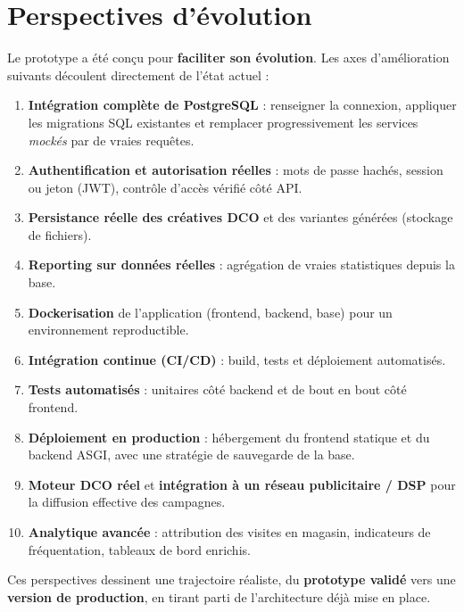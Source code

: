 \section{Perspectives d'évolution}

Le prototype a été conçu pour \textbf{faciliter son évolution}. Les axes
d'amélioration suivants découlent directement de l'état actuel :

\begin{enumerate}[label=\textbf{\arabic*.}]
  \item \textbf{Intégration complète de PostgreSQL} : renseigner la connexion,
        appliquer les migrations SQL existantes et remplacer progressivement
        les services \emph{mockés} par de vraies requêtes.
  \item \textbf{Authentification et autorisation réelles} : mots de passe
        hachés, session ou jeton (JWT), contrôle d'accès vérifié côté API.
  \item \textbf{Persistance réelle des créatives DCO} et des variantes
        générées (stockage de fichiers).
  \item \textbf{Reporting sur données réelles} : agrégation de vraies
        statistiques depuis la base.
  \item \textbf{Dockerisation} de l'application (frontend, backend, base) pour
        un environnement reproductible.
  \item \textbf{Intégration continue (CI/CD)} : build, tests et déploiement
        automatisés.
  \item \textbf{Tests automatisés} : unitaires côté backend et de bout en bout
        côté frontend.
  \item \textbf{Déploiement en production} : hébergement du frontend statique
        et du backend ASGI, avec une stratégie de sauvegarde de la base.
  \item \textbf{Moteur DCO réel} et \textbf{intégration à un réseau
        publicitaire / DSP} pour la diffusion effective des campagnes.
  \item \textbf{Analytique avancée} : attribution des visites en magasin,
        indicateurs de fréquentation, tableaux de bord enrichis.
\end{enumerate}

Ces perspectives dessinent une trajectoire réaliste, du \textbf{prototype
validé} vers une \textbf{version de production}, en tirant parti de
l'architecture déjà mise en place.

